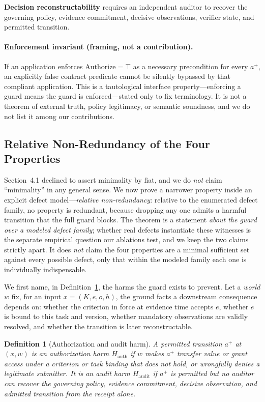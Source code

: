 \documentclass[sigconf,anonymous,review]{acmart}
\newtheorem{definition}{Definition}
\begin{document}
\textbf{Decision reconstructability} requires an independent auditor to recover the governing policy, evidence commitment, decisive observations, verifier state, and permitted transition.

\paragraph{Enforcement invariant (framing, not a contribution).} If an application enforces $\mathrm{Authorize}=\top$ as a necessary precondition for every $a^+$, an explicitly false contract predicate cannot be silently bypassed by that compliant application. This is a tautological interface property---enforcing a guard means the guard is enforced---stated only to fix terminology. It is not a theorem of external truth, policy legitimacy, or semantic soundness, and we do not list it among our contributions.

\subsection{Relative Non-Redundancy of the Four Properties}
Section~4.1 declined to assert minimality by fiat, and we do \emph{not} claim ``minimality'' in any general sense. We now prove a narrower property inside an explicit defect model---\emph{relative non-redundancy}: relative to the enumerated defect family, no property is redundant, because dropping any one admits a harmful transition that the full guard blocks. The theorem is a statement \emph{about the guard over a modeled defect family}; whether real defects instantiate these witnesses is the separate empirical question our ablations test, and we keep the two claims strictly apart. It does \emph{not} claim the four properties are a minimal sufficient set against every possible defect, only that within the modeled family each one is individually indispensable.

We first name, in Definition~\ref{def:harm}, the harms the guard exists to prevent. Let a \emph{world} $w$ fix, for an input $x=(K,e,o,h)$, the ground facts a downstream consequence depends on: whether the criterion in force at evidence time accepts $e$, whether $e$ is bound to this task and version, whether mandatory observations are validly resolved, and whether the transition is later reconstructable.

\begin{definition}[Authorization and audit harm]
\label{def:harm}
A permitted transition $a^+$ at $(x,w)$ is an \emph{authorization harm} $H_{\mathrm{auth}}$ if $w$ makes $a^+$ transfer value or grant access under a criterion or task binding that does not hold, or wrongfully denies a legitimate submitter. It is an \emph{audit harm} $H_{\mathrm{audit}}$ if $a^+$ is permitted but no auditor can recover the governing policy, evidence commitment, decisive observation, and admitted transition from the receipt alone.
\end{definition}
\end{document}
